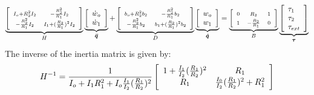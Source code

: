 \begin{align}
\underbrace{ 
\left[
\begin{array}{c c}
 \scriptstyle I_o + R_2^2 I_2           & \scriptstyle - \frac{R_2^2}{R_1} I_2       \\
 \scriptstyle - \frac{R_2^2}{R_1} I_2   & \scriptstyle I_1 + (\frac{R_2}{R_1})^2 I_2  \\
\end{array}
\right] }_{H}
\underbrace{ 
\left[
\begin{array}{l}
\dot{w}_o     \\
\dot{w}_1      \\
\end{array}
\right]}_{\vec{\ddot{q}}}
+
\underbrace{
\left[
\begin{array}{c c}
 \scriptstyle b_o + R_2^2 b_2           & \scriptstyle - \frac{R_2^2}{R_1} b_2       \\
 \scriptstyle- \frac{R_2^2}{R_1} b_2   & \scriptstyle b_1 + (\frac{R_2}{R_1})^2 b_2  \\
\end{array}
\right]
}_{D}
\underbrace{ 
\left[
\begin{array}{l}
w_o     \\
w_1      \\
\end{array}
\right]}_{\vec{\dot{q}}}
= 
\underbrace{ 
\left[
\begin{array}{c c c}
 \scriptstyle 0 & \scriptstyle R_2              & \scriptstyle 1 \\
 \scriptstyle 1 & \scriptstyle -\frac{R_2}{R_1} & \scriptstyle 0
\end{array}
\right]}_{B}
\underbrace{
\left[
\begin{array}{l}
 \tau_{1} \\
 \tau_{2} \\
 \tau_{ext}
\end{array}
\right] }_{\vec{\tau}}
\label{eq:dsdm_manip}
\end{align}
%
The inverse of the inertia matrix is given by:
\begin{align}
H^{-1} = 
\frac{1}{I_o + I_1 R_1 ^2 + I_o \frac{ I_1 }{ I_2 } (\frac{R_1}{R_2})^2}
\left[
\begin{array}{c c}
1 + \frac{ I_1 }{ I_2 } (\frac{R_1}{R_2})^2  & R_1    \\
R_1 & \frac{ I_0 }{ I_2 } (\frac{R_1}{R_2})^2 + R_1^2 \\
\end{array}
\right]
\end{align}
